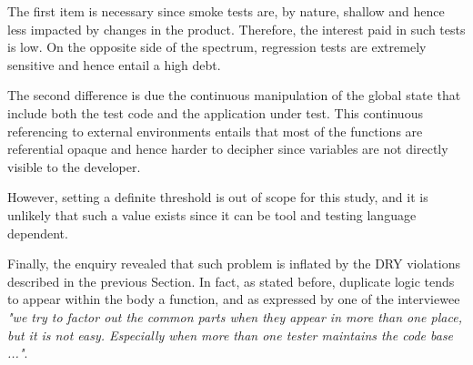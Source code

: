      \label{sec:disc-rq3-function-complexity}
    The first item is necessary since smoke tests are, by nature, shallow and hence less impacted by changes in the product. Therefore, the interest paid in such tests is low. On the opposite side of the spectrum, regression tests are extremely sensitive and hence entail a high debt.

    The second difference is due the continuous manipulation of the global state that include both the test code and the application under test. This continuous referencing to external environments entails that most of the functions are referential opaque \cite{referential_transparency} and hence harder to decipher since variables are not directly visible to the developer.

    However, setting a definite threshold is out of scope for this study, and it is unlikely that such a value exists since it can be tool and testing language dependent.

    Finally, the enquiry revealed that such problem is inflated by the DRY violations described in the previous Section. In fact, as stated before, duplicate logic tends to appear within the body a function, and as expressed by one of the interviewee \textit{"we try to factor out the common parts when they appear in more than one place, but it is not easy. Especially when more than one tester maintains the code base ..."}.




